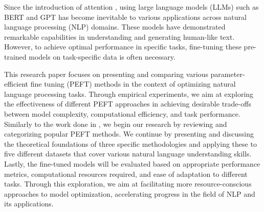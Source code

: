 Since the introduction of attention \cite{vaswani2017attention}, using large language models (LLMs) such as BERT \cite{devlin2019bert} and GPT \cite{radford2018gpt} has become inevitable to various applications across natural language processing (NLP) domains. These models have demonstrated remarkable capabilities in understanding and generating human-like text. However, to achieve optimal performance in specific tasks, fine-tuning these pre-trained models on task-specific data is often necessary.

This research paper focuses on presenting and comparing various parameter-efficient fine tuning (PEFT) methods in the context of optimizing natural language processing tasks. Through empirical experiments, we aim at exploring the effectiveness of different PEFT approaches in achieving desirable trade-offs between model complexity, computational efficiency, and task performance. Similarly to the work done in \cite{xu2023parameterefficient}, we begin our research by reviewing and categorizing popular PEFT methods. We continue by presenting and discussing the theoretical foundations of three specific methodologies and applying these to five different datasets that cover various natural language understanding skills. Lastly, the fine-tuned models will be evaluated based on appropriate performance metrics, computational resources required, and ease of adaptation to different tasks. Through this exploration, we aim at facilitating more resource-conscious approaches to model optimization, accelerating progress in the field of NLP and its applications.